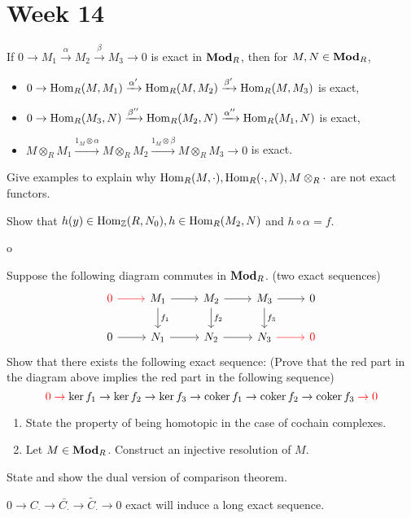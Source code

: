 
\section{Week 14}

\begin{exercise}
  If $0 \to M_1 \xrightarrow{\alpha} M_2 \xrightarrow{\beta} M_3 \to 0$
  is exact in $\mathbf{Mod}_R$, then for $M, N \in \mathbf{Mod}_R$,
  \begin{itemize}
    \item $0 \to \operatorname{Hom}_R(M, M_1) \xrightarrow{\alpha'}
      \operatorname{Hom}_R(M, M_2) \xrightarrow{\beta'} \operatorname{Hom}_R(M, M_3)$ is exact,
    \item $0 \to \operatorname{Hom}_R(M_3, N) \xrightarrow{\beta''}
      \operatorname{Hom}_R(M_2, N) \xrightarrow{\alpha''} \operatorname{Hom}_R(M_1, N)$ is exact,
    \item $M \otimes_R M_1 \xrightarrow{1_M \otimes \alpha}
      M\otimes_R M_2 \xrightarrow{1_M \otimes \beta} M\otimes_R M_3 \to 0$ is exact.
  \end{itemize}
\end{exercise}

\begin{exercise}
  Give examples to explain why $\operatorname{Hom}_R(M, \cdot), \operatorname{Hom}_R(\cdot, N), M\otimes_R \cdot$
  are not exact functors.
\end{exercise}

\begin{exercise}
  Show that $h(y) \in \operatorname{Hom}_{\mathbb{Z}}(R, N_0), h \in \operatorname{Hom}_R(M_2, N)$ and $h \circ \alpha = f$.
\end{exercise}
o
\begin{exercise}
  Suppose the following diagram commutes in $\mathbf{Mod}_R$.
  (two exact sequences)
  \[
    \begin{tikzcd}
      {\color{red} 0} \ar[r, red] & M_1 \ar[r] \ar[d, "f_1"]
      & M_2 \ar[r] \ar[d, "f_2"] & M_3 \ar[r] \ar[d, "f_3"] & 0 \\
      0 \ar[r] & N_1 \ar[r] & N_2 \ar[r] & N_3 \ar[r, red] & {\color{red} 0}
    \end{tikzcd}
  \]
  Show that there exists the following exact sequence:
  (Prove that the red part in the diagram above implies the red part in
  the following sequence)
  \[
    \mathcolor{red}{0 \to} \ker f_1 \to \ker f_2 \to \ker f_3
    \to \coker f_1 \to \coker f_2 \to \coker f_3 \mathcolor{red}{\to 0}
  \]
\end{exercise}

\begin{exercise} \mbox{}
  \begin{enumerate}[(1)]
    \item State the property of being homotopic in the case of cochain complexes.
    \item Let $M \in \mathbf{Mod}_R$. Construct an injective resolution of $M$.
  \end{enumerate}
\end{exercise}

\begin{exercise}
  State and show the dual version of comparison theorem.
\end{exercise}

\begin{exercise}
  $0 \to C_\cdot \to \bar{C_\cdot} \to \tilde{C_\cdot} \to 0$ exact
  will induce a long exact sequence.
\end{exercise}
